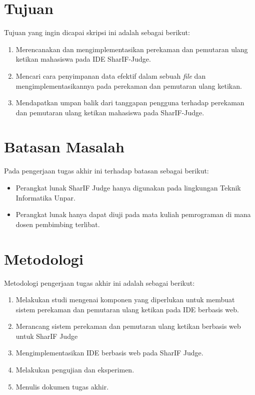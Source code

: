 \section{Tujuan}
\label{sec:1:tujuan}

Tujuan yang ingin dicapai skripsi ini adalah sebagai berikut:
\begin{enumerate}
    \item Merencanakan dan mengimplementasikan perekaman dan pemutaran ulang ketikan mahasiswa pada IDE SharIF-Judge.
    \item Mencari cara penyimpanan data efektif dalam sebuah \textit{file} dan mengimplementasikannya pada perekaman dan pemutaran ulang ketikan.
    \item Mendapatkan umpan balik dari tanggapan pengguna terhadap perekaman dan pemutaran ulang ketikan mahasiswa pada SharIF-Judge.
\end{enumerate}

\section{Batasan Masalah}
\label{sec:1:batasan}

Pada pengerjaan tugas akhir ini terhadap batasan sebagai berikut:
\begin{itemize}
    \item Perangkat lunak SharIF Judge hanya digunakan pada lingkungan Teknik Informatika Unpar.
    \item Perangkat lunak hanya dapat diuji pada mata kuliah pemrograman di mana dosen pembimbing terlibat.
\end{itemize}

\section{Metodologi}
\label{sec:1:metlit}

Metodologi pengerjaan tugas akhir ini adalah sebagai berikut:
\begin{enumerate}
    \item Melakukan studi mengenai komponen yang diperlukan untuk membuat sistem perekaman dan pemutaran ulang ketikan pada IDE berbasis web.
    \item Merancang sistem perekaman dan pemutaran ulang ketikan berbasis web untuk SharIF Judge
    \item Mengimplementasikan IDE berbasis web pada SharIF Judge.
    \item Melakukan pengujian dan eksperimen.
    \item Menulis dokumen tugas akhir.
\end{enumerate}

